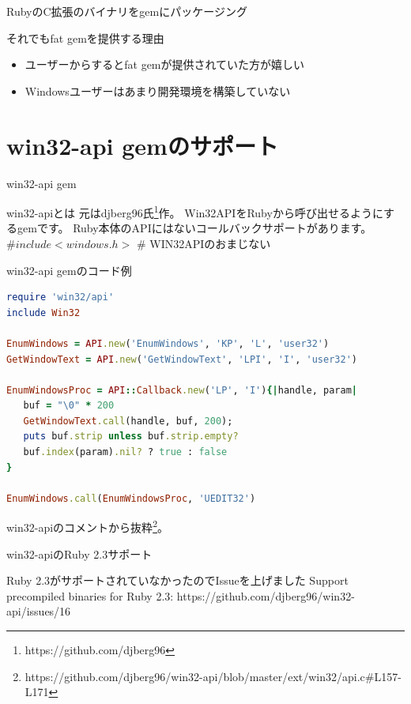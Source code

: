 \documentclass[12pt, unicode]{beamer}
\begin{document}
\begin{frame}{RubyのC拡張のバイナリをgemにパッケージング}
  \begin{block}{それでもfat gemを提供する理由}
    \begin{itemize}
    \item ユーザーからするとfat gemが提供されていた方が嬉しい
    \item Windowsユーザーはあまり開発環境を構築していない
    \end{itemize}
  \end{block}
\end{frame}

\section[]{win32-api gemのサポート}
\begin{frame}{win32-api gem}
  \begin{block}{win32-apiとは}
    元はdjberg96氏\footnote[frame]{https://github.com/djberg96}作。\newline
    Win32APIをRubyから呼び出せるようにするgemです。\newline
    Ruby本体のAPIにはないコールバックサポートがあります。\newline
    {\bf $\#include <windows.h>$ }\# WIN32APIのおまじない
  \end{block}
\end{frame}

\newcommand\XSmall{\fontsize{8.5}{9}\selectfont}
\begin{frame}[fragile]{win32-api gemのコード例}
\begin{lstlisting}[language=Ruby,basicstyle=\ttfamily\XSmall]
require 'win32/api'
include Win32

EnumWindows = API.new('EnumWindows', 'KP', 'L', 'user32')
GetWindowText = API.new('GetWindowText', 'LPI', 'I', 'user32')

EnumWindowsProc = API::Callback.new('LP', 'I'){|handle, param|
   buf = "\0" * 200
   GetWindowText.call(handle, buf, 200);
   puts buf.strip unless buf.strip.empty?
   buf.index(param).nil? ? true : false
}

EnumWindows.call(EnumWindowsProc, 'UEDIT32')
\end{lstlisting}
win32-apiのコメントから抜粋\footnote[frame]{https://github.com/djberg96/win32-api/blob/master/ext/win32/api.c\#L157-L171}。
\end{frame}

\begin{frame}{win32-apiのRuby 2.3サポート}
  \large{
    \begin{block}{Ruby 2.3がサポートされていなかったのでIssueを上げました}
      Support precompiled binaries for Ruby 2.3: \newline
      https://github.com/djberg96/win32-api/issues/16
    \end{block}
  }
\end{frame}
\end{document}
